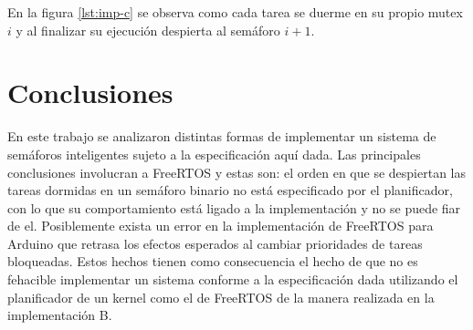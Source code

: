 	En la figura \ref{lst:imp-c} se observa como cada tarea se duerme en su propio mutex $i$ y al finalizar su ejecución despierta al semáforo $i+1$.



\section{Conclusiones}\label{sec:conclusiones}
	En este trabajo se analizaron distintas formas de implementar un sistema de semáforos inteligentes sujeto a la especificación aquí dada. Las principales conclusiones involucran a FreeRTOS y estas son: el orden en que se despiertan las tareas dormidas en un semáforo binario no está especificado por el planificador, con lo que su comportamiento está ligado a la implementación y no se puede fiar de el. Posiblemente exista un error en la implementación de FreeRTOS para Arduino que retrasa los efectos esperados al cambiar prioridades de tareas bloqueadas.
	Estos hechos tienen como consecuencia el hecho de que no es fehacible implementar un sistema conforme a la especificación dada utilizando el planificador de un kernel como el de FreeRTOS de la manera realizada en la implementación B.

